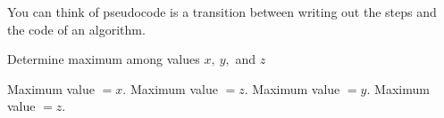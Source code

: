 \documentclass[12pt]{article}
\theoremstyle{definition}
\begin{document}
You can think of pseudocode is a transition between writing out the steps and the code of an algorithm.

\begin{algorithm}
\caption{Determine maximum among values $x, \ y,$ and $z$}
\begin{algorithmic} 
		\STATE Maximum value $= x$.
	\ELSE
		\STATE Maximum value $= z$.
	\ENDIF
\ELSE
		\STATE Maximum value $= y$.
	\ELSE
		\STATE Maximum value $= z$.
	\ENDIF
\ENDIF
\end{algorithmic}
\end{algorithm}

\end{document}
